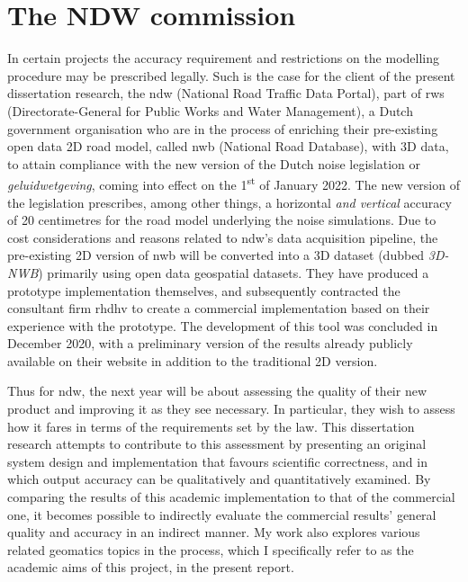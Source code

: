 \section{The NDW commission}
\label{sec:commission}

In certain projects the accuracy requirement and restrictions on the modelling procedure may be prescribed legally. Such is the case for the client of the present dissertation research, the \ac{ndw} (National Road Traffic Data Portal), part of \ac{rws} (Directorate-General for Public Works and Water Management), a Dutch government organisation who are in the process of enriching their pre-existing open data 2D road model, called \ac{nwb} (National Road Database), with 3D data, to attain compliance with the new version of the Dutch noise legislation or \textit{geluidwetgeving}, coming into effect on the 1\textsuperscript{st} of January 2022. The new version of the legislation prescribes, among other things, a horizontal \textit{and vertical} accuracy of 20 centimetres for the road model underlying the noise simulations. Due to cost considerations and reasons related to \ac{ndw}’s data acquisition pipeline, the pre-existing 2D version of \ac{nwb} will be converted into a 3D dataset (dubbed \textit{3D-NWB}) primarily using open data geospatial datasets. They have produced a prototype implementation themselves, and subsequently contracted the consultant firm \ac{rhdhv} to create a commercial implementation based on their experience with the prototype. The development of this tool was concluded in December 2020, with a preliminary version of the results already publicly available on their website in addition to the traditional 2D version.

Thus for \ac{ndw}, the next year will be about assessing the quality of their new product and improving it as they see necessary. In particular, they wish to assess how it fares in terms of the requirements set by the law. This dissertation research attempts to contribute to this assessment by presenting an original system design and implementation that favours scientific correctness, and in which output accuracy can be qualitatively and quantitatively examined. By comparing the results of this academic implementation to that of the commercial one, it becomes possible to indirectly evaluate the commercial results' general quality and accuracy in an indirect manner. My work also explores various related geomatics topics in the process, which I specifically refer to as the academic aims of this project, in the present report.

